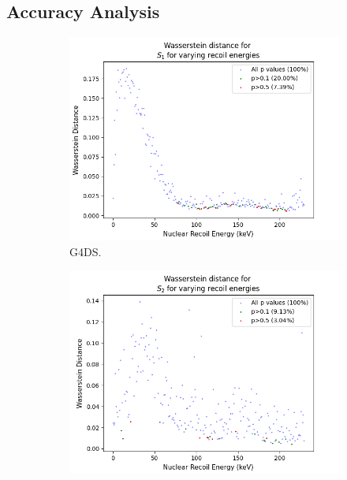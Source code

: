 \documentclass[11pt]{article} %
\begin{document}
\subsection{Accuracy Analysis}
\begin{figure}[H]
\centering
\begin{minipage}{\textwidth}
  \begin{subfigure}{.5\textwidth}
      \centering\captionsetup{width=.8\linewidth}%
      \includegraphics[scale=0.6]{./images/wasserstein_distance_s1.png}
      \caption{G4DS.}
  \end{subfigure}
  \begin{subfigure}{.5\textwidth}
      \centering\captionsetup{width=.8\linewidth}%
      \includegraphics[scale=0.6]{./images/wasserstein_distance_s2.png}

\end{subfigure}
\end{minipage}
\end{figure}
\end{document}
